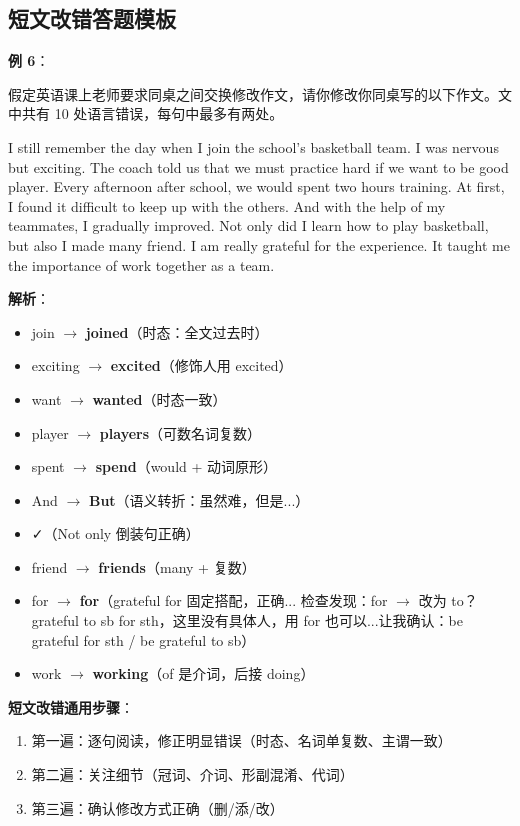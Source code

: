 \subsection{短文改错答题模板}

\textbf{例 6}：

假定英语课上老师要求同桌之间交换修改作文，请你修改你同桌写的以下作文。文中共有 10 处语言错误，每句中最多有两处。

\medskip

I still remember the day when I join the school's basketball team. I was nervous but exciting. The coach told us that we must practice hard if we want to be good player. Every afternoon after school, we would spent two hours training. At first, I found it difficult to keep up with the others. And with the help of my teammates, I gradually improved. Not only did I learn how to play basketball, but also I made many friend. I am really grateful for the experience. It taught me the importance of work together as a team.

\medskip

\textbf{解析}：
\begin{itemize}
  \item join $\to$ \textbf{joined}（时态：全文过去时）
  \item exciting $\to$ \textbf{excited}（修饰人用 excited）
  \item want $\to$ \textbf{wanted}（时态一致）
  \item player $\to$ \textbf{players}（可数名词复数）
  \item spent $\to$ \textbf{spend}（would + 动词原形）
  \item And $\to$ \textbf{But}（语义转折：虽然难，但是...）
  \item ✓（Not only 倒装句正确）
  \item friend $\to$ \textbf{friends}（many + 复数）
  \item for $\to$ \textbf{for}（grateful for 固定搭配，正确... 检查发现：for $\to$ 改为 to？grateful to sb for sth，这里没有具体人，用 for 也可以...让我确认：be grateful for sth / be grateful to sb）
  \item work $\to$ \textbf{working}（of 是介词，后接 doing）
\end{itemize}

\textbf{短文改错通用步骤}：
\begin{enumerate}
  \item 第一遍：逐句阅读，修正明显错误（时态、名词单复数、主谓一致）
  \item 第二遍：关注细节（冠词、介词、形副混淆、代词）
  \item 第三遍：确认修改方式正确（删/添/改）
\end{enumerate}

